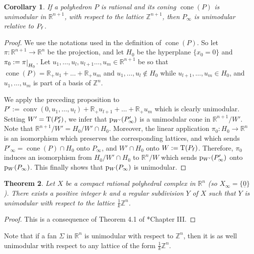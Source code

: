 \documentclass[11pt]{amsart}
\newtheorem{thm}{Theorem}[section]
\newtheorem{cor}[thm]{Corollary}
\theoremstyle{definition}
\newenvironment{remark}
  {\pushQED{\qed}\renewcommand{\qedsymbol}{$\diamond$}\remm}
  {\popQED\endremm}
\numberwithin{equation}{section}
\renewcommand{\~}{\widetilde}
\newcommand{\Z}{\mathbb{Z}}
\newcommand{\R}{\mathbb{R}}
\newcommand{\rquot}[2]{#1\big/#2}
\newcommand{\rest}[1]{\raisebox{-1pt}{$\vert$}_{#1}}
\newcommand{\f}{{\textnormal{\textsl{\textsf f}}}} %
\newcommand{\TT}{\mathrm{T}} %
\newcommand{\p}{{\rm p}} %
\newcommand{\conezero}{{\underline0}} %
\DeclareMathOperator{\conv}{conv} %
\DeclareMathOperator{\coneupop}{cone}
\newcommand{\coneup}[1]{\coneupop(#1)} %
\begin{document}
\begin{cor} \label{cor:coneup_modulaire}
If a polyhedron $P$ is \emph{rational} and its coning $\coneup{P}$ is unimodular in $\R^{n+1}$, with respect to the lattice $\Z^{n+1}$, then $P_\infty$ is unimodular relative to $P_\f$.
\end{cor}

\begin{proof}
We use the notations used in the definition of $\coneup P$. So let $\pi\colon\R^{n+1}\to\R^n$ be the projection, and let $H_0$ be the hyperplane $\{x_0=0\}$ and $\pi_0:=\pi\rest{H_0}$. Let $u_1, \dots, u_l, u_{l+1} \dots, u_m\in\R^{n+1}$ be so that $\coneup P=\R_+u_1+\dots+\R_+u_m$ and $u_1,\dots,u_l\not\in H_0$ while $u_{l+1}, \dots, u_m\in H_0$, and $u_1,\dots,u_m$ is part of a basis of $\Z^n$.

We apply the preceding proposition to $P':=\conv(0,u_1,\dots, u_l)+\R_+u_{l+1}+\dots+\R_+u_m$ which is clearly unimodular. Setting $W'=\TT(P'_\f)$, we infer that $\p_{W'}(P'_\infty)$ is a unimodular cone in $\rquot{\R^{n+1}}{W'}$. Note that $\rquot{\R^{n+1}}{W'}=\rquot{H_0}{W'\!\cap\!H_0}$. Moreover, the linear application $\pi_0\colon H_0\to\R^n$ is an isomorphism which preserves the corresponding lattices, and which sends $P'_\infty=\coneup P\cap H_0$ onto $P_\infty$, and $W'\cap H_0$ onto $W := \TT(P_\f)$. Therefore, $\pi_0$ induces an isomorphism from $\rquot{H_0}{W'\!\cap\!H_0}$ to $\rquot{\R^n}{W}$ which sends $\p_{W'}(P'_\infty)$ onto $\p_W(P_\infty)$. This finally shows that $\p_W(P_\infty)$ is unimodular.
\end{proof}

\begin{thm} \label{thm:triangulation_unimodulaire_projective}
Let $X$ be a \emph{compact} rational polyhedral complex in $\R^n$ (so $X_\infty=\{\conezero\}$). There exists a positive integer $k$ and a regular subdivision $Y$ of $X$ such that $Y$ is unimodular with respect to the lattice $\frac 1k \Z^n$.
\end{thm}

\begin{proof}
This is a consequence of Theorem 4.1 of \cite{KKMS}*{Chapter III}.
\end{proof}

\begin{remark} \label{rem:stabilite_eventail_unimodulaire}
Note that if a fan $\Sigma$ in $\R^n$ is unimodular with respect to $\Z^n$, then it is as well unimodular with respect to any lattice of the form $\frac1k\Z^n$.
\end{remark}
\end{document}
